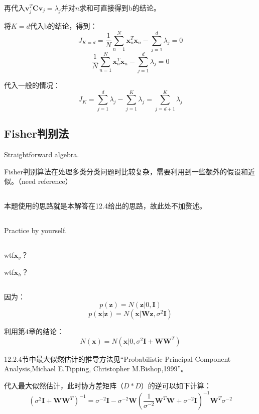 \documentclass[UTF8]{ctexart}
\begin{document}
再代入$\textbf{v}_{j}^{T}\textbf{C}\textbf{v}_{j}=\lambda_{j}$并对$n$求和可直接得到b的结论。

将$K=d$代入b的结论，得到：
$$J_{K=d}=\frac{1}{N}\sum_{n=1}^{N}\textbf{x}_{n}^{T}\textbf{x}_{n}-\sum_{j=1}^{d}\lambda_{j}=0$$
$$\frac{1}{N}\sum_{n=1}^{N}\textbf{x}_{n}^{T}\textbf{x}_{n}-\sum_{j=1}^{d}\lambda_{j}=0$$

代入一般的情况：
$$J_{K}=\sum_{j=1}^{d}\lambda_{j}-\sum_{j=1}^{K}\lambda_{j}=\sum_{j=d+1}^{K}\lambda_{j}$$

\subsection{Fisher判别法}
Straightforward algebra.

Fisher判别算法在处理多类分类问题时比较复杂，需要利用到一些额外的假设和近似。（need reference）

\subsection{}
本题使用的思路就是本解答在12.4给出的思路，故此处不加赘述。

\subsection{}
Practice by yourself.

\subsection{}
wtf$\textbf{x}_{v}$？

wtf$\textbf{x}_{h}$？


\subsection{}
因为：
$$p(\textbf{z})=N(\textbf{z}|0,\textbf{I})$$
$$p(\textbf{x}|\textbf{z})=N(\textbf{x}|\textbf{W}\textbf{z},\sigma^{2}\textbf{I})$$

利用第4章的结论：
$$N(\textbf{x})=N(\textbf{x}|0,\sigma^{2}\textbf{I}+\textbf{W}\textbf{W}^{T})$$

12.2.4节中最大似然估计的推导方法见“Probabilistic Principal Component Analysis,Michael E.Tipping, Christopher M.Bishop,1999”。

代入最大似然估计，此时协方差矩阵（$D*D$）的逆可以如下计算：
$$(\sigma^{2}\textbf{I}+\textbf{W}\textbf{W}^{T})^{-1}=\sigma^{-2}\textbf{I} - \sigma^{-2}\textbf{W}(\frac{1}{\sigma^{-2}}\textbf{W}^{T}\textbf{W}+\sigma^{-2}\textbf{I})^{-1}\textbf{W}^{T}\sigma^{-2}$$
\end{document}
